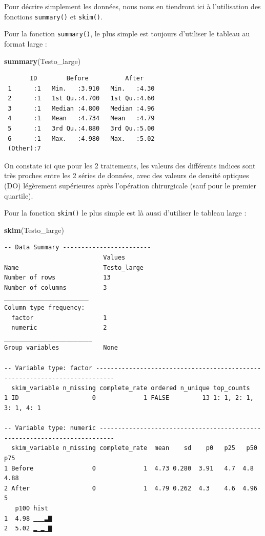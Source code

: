 \documentclass[a4paperpaper,]{article}
\newenvironment{Shaded}{\begin{snugshade}}{\end{snugshade}}
\newcommand{\KeywordTok}[1]{\textcolor[rgb]{0.12,0.11,0.11}{\textbf{#1}}}
\newcommand{\NormalTok}[1]{\textcolor[rgb]{0.12,0.11,0.11}{#1}}
\begin{document}
Pour décrire simplement les données, nous nous en tiendront ici à l'utilisation des fonctions \texttt{summary()} et \texttt{skim()}.

Pour la fonction \texttt{summary()}, le plus simple est toujours d'utiliser le tableau au format large :

\begin{Shaded}
\begin{Highlighting}[]
\KeywordTok{summary}\NormalTok{(Testo_large)}
\end{Highlighting}
\end{Shaded}

\begin{verbatim}
       ID        Before          After     
 1      :1   Min.   :3.910   Min.   :4.30  
 2      :1   1st Qu.:4.700   1st Qu.:4.60  
 3      :1   Median :4.800   Median :4.96  
 4      :1   Mean   :4.734   Mean   :4.79  
 5      :1   3rd Qu.:4.880   3rd Qu.:5.00  
 6      :1   Max.   :4.980   Max.   :5.02  
 (Other):7                                 
\end{verbatim}

On constate ici que pour les 2 traitements, les valeurs des différents indices sont très proches entre les 2 séries de données, avec des valeurs de densité optiques (DO) légèrement supérieures après l'opération chirurgicale (sauf pour le premier quartile).

Pour la fonction \texttt{skim()} le plus simple est là aussi d'utiliser le tableau large :

\begin{Shaded}
\begin{Highlighting}[]
\KeywordTok{skim}\NormalTok{(Testo_large)}
\end{Highlighting}
\end{Shaded}

\begin{verbatim}
-- Data Summary ------------------------
                           Values     
Name                       Testo_large
Number of rows             13         
Number of columns          3          
_______________________               
Column type frequency:                
  factor                   1          
  numeric                  2          
________________________              
Group variables            None       

-- Variable type: factor ---------------------------------------------------------------------------
  skim_variable n_missing complete_rate ordered n_unique top_counts            
1 ID                    0             1 FALSE         13 1: 1, 2: 1, 3: 1, 4: 1

-- Variable type: numeric --------------------------------------------------------------------------
  skim_variable n_missing complete_rate  mean    sd    p0   p25   p50   p75
1 Before                0             1  4.73 0.280  3.91   4.7  4.8   4.88
2 After                 0             1  4.79 0.262  4.3    4.6  4.96  5   
   p100 hist 
1  4.98 ▁▁▁▃▇
2  5.02 ▂▁▂▁▇
\end{verbatim}
\end{document}
